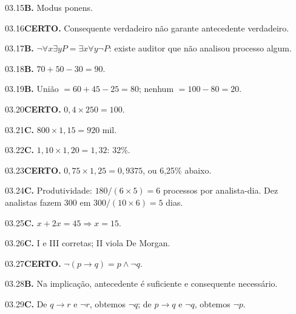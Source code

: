 \begin{solucao}{03.15}\textbf{B.} Modus ponens.\end{solucao}
\begin{solucao}{03.16}\textbf{CERTO.} Consequente verdadeiro não garante antecedente verdadeiro.\end{solucao}
\begin{solucao}{03.17}\textbf{B.} $\neg\forall x\exists y P=\exists x\forall y\neg P$: existe auditor que não analisou processo algum.\end{solucao}
\begin{solucao}{03.18}\textbf{B.} $70+50-30=90$.\end{solucao}
\begin{solucao}{03.19}\textbf{B.} União $=60+45-25=80$; nenhum $=100-80=20$.\end{solucao}
\begin{solucao}{03.20}\textbf{CERTO.} $0,4\times250=100$.\end{solucao}
\begin{solucao}{03.21}\textbf{C.} $800\times1,15=920$ mil.\end{solucao}
\begin{solucao}{03.22}\textbf{C.} $1,10\times1,20=1,32$: 32\%.\end{solucao}
\begin{solucao}{03.23}\textbf{CERTO.} $0,75\times1,25=0,9375$, ou 6,25\% abaixo.\end{solucao}
\begin{solucao}{03.24}\textbf{C.} Produtividade: $180/(6\times5)=6$ processos por analista-dia. Dez analistas fazem 300 em $300/(10\times6)=5$ dias.\end{solucao}
\begin{solucao}{03.25}\textbf{C.} $x+2x=45\Rightarrow x=15$.\end{solucao}
\begin{solucao}{03.26}\textbf{C.} I e III corretas; II viola De Morgan.\end{solucao}
\begin{solucao}{03.27}\textbf{CERTO.} $\neg(p\to q)=p\land\neg q$.\end{solucao}
\begin{solucao}{03.28}\textbf{B.} Na implicação, antecedente é suficiente e consequente necessário.\end{solucao}
\begin{solucao}{03.29}\textbf{C.} De $q\to r$ e $\neg r$, obtemos $\neg q$; de $p\to q$ e $\neg q$, obtemos $\neg p$.\end{solucao}
